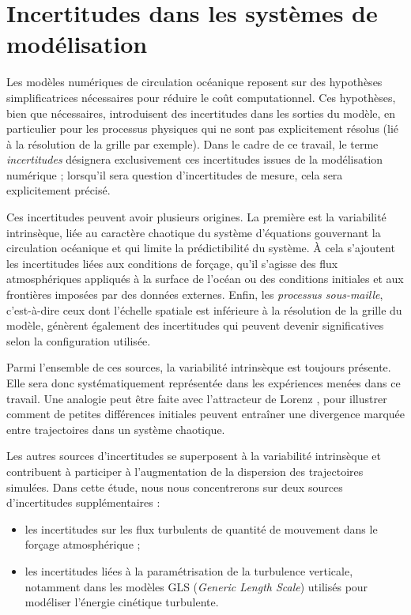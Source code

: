 \section{Incertitudes dans les systèmes de modélisation}

Les modèles numériques de circulation océanique reposent sur des hypothèses simplificatrices nécessaires pour réduire le coût computationnel. Ces hypothèses, bien que nécessaires, introduisent des incertitudes dans les sorties du modèle, en particulier pour les processus physiques qui ne sont pas explicitement résolus (lié à la résolution de la grille par exemple). Dans le cadre de ce travail, le terme \textit{incertitudes} désignera exclusivement ces incertitudes issues de la modélisation numérique ; lorsqu’il sera question d’incertitudes de mesure, cela sera explicitement précisé.

Ces incertitudes peuvent avoir plusieurs origines. La première est la variabilité intrinsèque, liée au caractère chaotique du système d’équations gouvernant la circulation océanique et qui limite la prédictibilité du système. À cela s’ajoutent les incertitudes liées aux conditions de forçage, qu’il s’agisse des flux atmosphériques appliqués à la surface de l’océan ou des conditions initiales et aux frontières imposées par des données externes. Enfin, les \textit{processus sous-maille}, c’est-à-dire ceux dont l’échelle spatiale est inférieure à la résolution de la grille du modèle, génèrent également des incertitudes qui peuvent devenir significatives selon la configuration utilisée.

Parmi l’ensemble de ces sources, la variabilité intrinsèque est toujours présente. Elle sera donc systématiquement représentée dans les expériences menées dans ce travail. Une analogie peut être faite avec l’attracteur de Lorenz \cite{atencia_analogs_2017}, pour illustrer comment de petites différences initiales peuvent entraîner une divergence marquée entre trajectoires dans un système chaotique.

Les autres sources d’incertitudes se superposent à la variabilité intrinsèque et contribuent à participer à l'augmentation de la dispersion des trajectoires simulées. Dans cette étude, nous nous concentrerons sur deux sources d’incertitudes supplémentaires :
\begin{itemize}
    \item les incertitudes sur les flux turbulents de quantité de mouvement dans le forçage atmosphérique ;
    \item les incertitudes liées à la paramétrisation de la turbulence verticale, notamment dans les modèles GLS (\textit{Generic Length Scale}) utilisés pour modéliser l’énergie cinétique turbulente.
\end{itemize}

